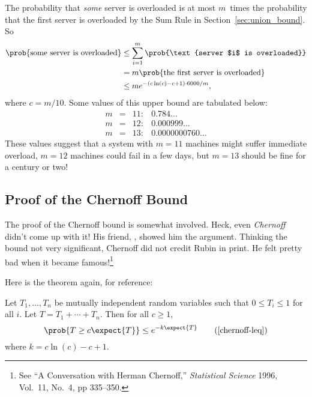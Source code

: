 The probability that \emph{some} server is overloaded is at most
$m$~times the probability that the first server is overloaded by the
Sum Rule in Section~\ref{sec:union_bound}.  So
\begin{align*}
\prob{\text{some server is overloaded}}
    &\le \sum_{i = 1}^m \prob{\text{server $i$ is overloaded}} \\
    &= m \prob{\text{the first server is overloaded}} \\
    &\leq m e^{-(c \ln(c) - c + 1) \cdot 6000 / m},
\end{align*}
where $c = m/10$. Some values of this upper bound are tabulated below:
\[
\begin{array}{rcll}
m & = & 11: & 0.784\dots \\
m & = & 12: & 0.000999\dots \\
m & = & 13: & 0.0000000760\dots
\end{array}
\]
These values suggest that a system with $m = 11$ machines might suffer
immediate overload, $m = 12$ machines could fail in a few days, but $m
= 13$ should be fine for a century or two!

\subsection{Proof of the Chernoff Bound}\label{sec:chernoff_proof}

The proof of the Chernoff bound is somewhat involved.  Heck, even
\emph{Chernoff} didn't come up with it!  His friend, , showed him the argument.  Thinking the bound not very
significant, Chernoff did not credit Rubin in print.  He felt pretty
bad when it became famous!\footnote{See ``A Conversation with Herman
  Chernoff,'' \emph{Statistical Science} 1996, Vol.~11, No.~4, pp
  335--350.}

Here is the theorem again, for reference:

\begin{theorem}
Let $T_1, \dots, T_n$ be mutually independent random variables such
that $0 \leq T_i \leq 1$ for all $i$.  Let $T = T_1 + \cdots + T_n$.
Then for all $c \geq 1$,
\begin{equation}
\prob{T \geq c \expect{T}} \leq e^{-k \expect{T}}
\tag{\ref{chernoff-leq}}
\end{equation}
where $k = c \ln(c) - c + 1$.
\end{theorem}

